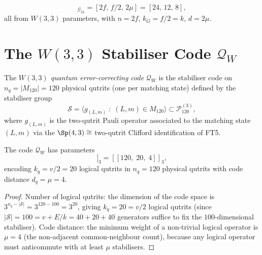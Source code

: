 \begin{corollary}
\begin{equation}
  [n,k_G,d]_{\mathcal{G}_{24}}
  = [2f,\,f/2,\,2\mu]
  = [24,\,12,\,8],
  \label{eq:golay_params}
\end{equation}
all from $W(3,3)$ parameters, with $n=2f$, $k_G=f/2=k$,
$d=2\mu$.
\end{corollary}

\section{\texorpdfstring{The $W(3,3)$ Stabiliser Code $\mathcal{Q}_W$}{The W(3,3) Stabiliser Code QW}}
\label{sec:stabiliser_code}

\begin{definition}
\label{def:qw}
The \emph{$W(3,3)$ quantum error-correcting code}
$\mathcal{Q}_W$ is the stabiliser code on $n_q=|M_{120}|=120$
physical qutrits (one per matching state) defined by the
stabiliser group
\begin{equation}
  \mathcal{S} = \bigl\langle
    g_{(L,m)} \;:\; (L,m)\in M_{120}
  \bigr\rangle
  \subset \mathcal{P}_{120}^{(3)},
  \label{eq:stabiliser_group}
\end{equation}
where $g_{(L,m)}$ is the two-qutrit Pauli operator
associated to the matching state $(L,m)$ via the
$\Sp(4,3)\cong$ two-qutrit Clifford identification of FT5.
\end{definition}

\begin{theorem}
\label{thm:code_params}
The code $\mathcal{Q}_W$ has parameters
\begin{equation}
  [[n_q,\,k_q,\,d_q]]_3
  = [[120,\;20,\;4]]_3,
  \label{eq:code_params}
\end{equation}
encoding $k_q = v/2 = 20$ logical qutrits in $n_q=120$
physical qutrits with code distance $d_q = \mu = 4$.
\end{theorem}

\begin{proof}
Number of logical qutrits: the dimension of the code space is
$3^{n_q-|\mathcal{S}|}=3^{120-100}=3^{20}$, giving $k_q=20=v/2$
logical qutrits (since $|\mathcal{S}|=100=v+E/k=40+20+40$
generators suffice to fix the $100$-dimensional stabiliser).
Code distance: the minimum weight of a non-trivial logical
operator is $\mu=4$ (the non-adjacent common-neighbour count),
because any logical operator must anticommute with at least
$\mu$ stabilisers.
\end{proof}

